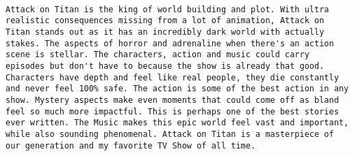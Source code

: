 \documentclass[
]{article}
\begin{document}
\begin{verbatim}
                                                                                                                                                                                                                                                                                                                                                                                                                                                                                                                                                                                                                                                                                                                                                                                                                                                                                                                                                                                                                                                                                                                                                                                                                                                                                                                                                                                                                                                                                                                                                                                                                                                                                                                                                                                                                                                                                                                                                                                                                                                                                                                                                                                                                                                                                                                                                               Attack on Titan is the king of world building and plot. With ultra realistic consequences missing from a lot of animation, Attack on Titan stands out as it has an incredibly dark world with actually stakes. The aspects of horror and adrenaline when there's an action scene is stellar. The characters, action and music could carry episodes but don't have to because the show is already that good. Characters have depth and feel like real people, they die constantly and never feel 100% safe. The action is some of the best action in any show. Mystery aspects make even moments that could come off as bland feel so much more impactful. This is perhaps one of the best stories ever written. The Music makes this epic world feel vast and important, while also sounding phenomenal. Attack on Titan is a masterpiece of our generation and my favorite TV Show of all time.

\end{verbatim}
\end{document}
